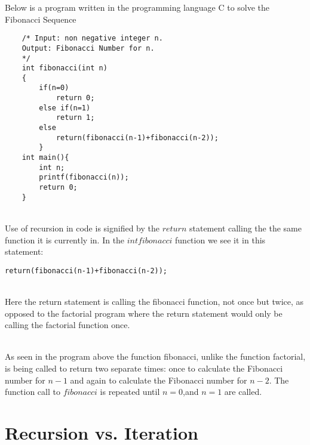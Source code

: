 \documentclass{article}
\begin{document}
Below is a program written in the programming language C to solve the Fibonacci Sequence 
\\
\begin{lstlisting}
	/* Input: non negative integer n.
	Output: Fibonacci Number for n.
	*/
	int fibonacci(int n)
	{
		if(n=0)
			return 0;
		else if(n=1)
			return 1;
		else
			return(fibonacci(n-1)+fibonacci(n-2));
		}
	int main(){
		int n;
		printf(fibonacci(n));
		return 0;
	}

\end{lstlisting}
~\\
Use of recursion in code is signified by the $return$ statement calling the the same function it is currently in. In the $int fibonacci$ function we see it in this statement:
\\
\begin{lstlisting}
return(fibonacci(n-1)+fibonacci(n-2));
\end{lstlisting}
~\\
Here the return statement is calling the fibonacci function, not once but twice, as opposed to the factorial program where the return statement would only be calling the factorial function once.  
	
\begin{comment}
n=4
f(3)f(2)
f(
\end{comment}
~\\
As seen in the program above the function fibonacci, unlike the function factorial, is being called to return two separate times: once to calculate the Fibonacci number for $n-1$ and again to calculate the Fibonacci number for $n-2$.  The function call to $fibonacci$ is repeated until $n=0$,and $n=1$ are called.
\section{Recursion vs. Iteration}
\end{document}
